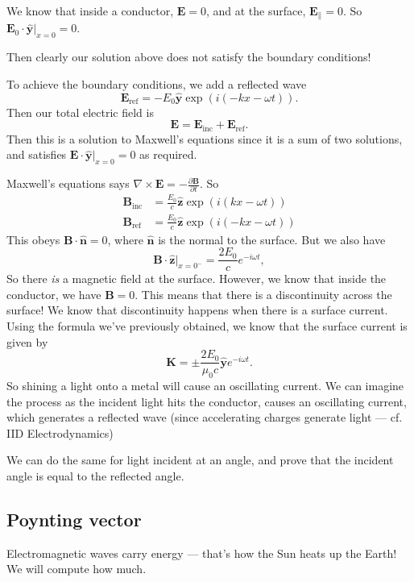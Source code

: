 \documentclass[a4paper]{article}
\begin{document}
We know that inside a conductor, $\mathbf{E} = 0$, and at the surface, $\mathbf{E}_{\parallel} = 0$. So $\mathbf{E}_0 \cdot \hat{\mathbf{y}}|_{x = 0} = 0$.

Then clearly our solution above does not satisfy the boundary conditions!

To achieve the boundary conditions, we add a reflected wave
\[
  \mathbf{E}_{\mathrm{ref}} = -E_0 \hat{\mathbf{y}} \exp(i(-kx - \omega t)).
\]
Then our total electric field is
\[
  \mathbf{E} = \mathbf{E}_{\mathrm{inc}} + \mathbf{E}_{\mathrm{ref}}.
\]
Then this is a solution to Maxwell's equations since it is a sum of two solutions, and satisfies $\mathbf{E}\cdot \hat{\mathbf{y}}|_{x = 0} = 0$ as required.

Maxwell's equations says $\nabla\times \mathbf{E} = -\frac{\partial \mathbf{B}}{\partial t}$. So
\begin{align*}
  \mathbf{B}_{\mathrm{inc}} &= \frac{E_0}{c}\hat{\mathbf{z}} \exp(i(kx - \omega t))\\
  \mathbf{B}_{\mathrm{ref}} &= \frac{E_0}{c}\hat{\mathbf{z}} \exp(i(-kx - \omega t))
\end{align*}
This obeys $\mathbf{B}\cdot \hat{\mathbf{n}} = 0$, where $\hat{\mathbf{n}}$ is the normal to the surface. But we also have
\[
  \mathbf{B}\cdot \hat{\mathbf{z}}|_{x = 0^-} = \frac{2E_0}{c}e^{-i\omega t},
\]
So there \emph{is} a magnetic field at the surface. However, we know that inside the conductor, we have $\mathbf{B} = 0$. This means that there is a discontinuity across the surface! We know that discontinuity happens when there is a surface current. Using the formula we've previously obtained, we know that the surface current is given by
\[
  \mathbf{K} = \pm\frac{2E_0}{\mu_0 c}\hat{\mathbf{y}} e^{-i \omega t}.
\]
So shining a light onto a metal will cause an oscillating current. We can imagine the process as the incident light hits the conductor, causes an oscillating current, which generates a reflected wave (since accelerating charges generate light --- cf. IID Electrodynamics)

We can do the same for light incident at an angle, and prove that the incident angle is equal to the reflected angle.

\subsection{Poynting vector}
Electromagnetic waves carry energy --- that's how the Sun heats up the Earth! We will compute how much.
\end{document}
